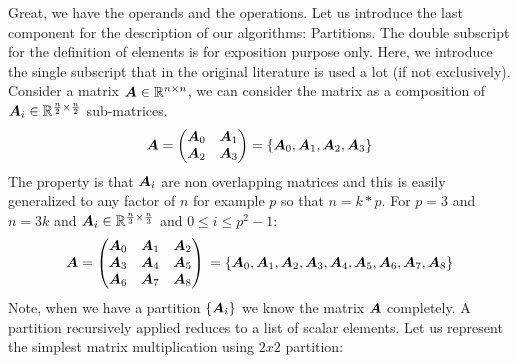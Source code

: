 \documentclass[acmsmall]{acmart}
\begin{document}
Great, we have the operands and the operations. Let us introduce the
last component for the description of our algorithms: Partitions.  The
double subscript for the definition of elements is for exposition
purpose only. Here, we introduce the single subscript that in the
original literature is used a lot (if not exclusively). Consider a
matrix ${\boldsymbol A} \in \mathbb{R}^{n\times n}$, we can consider the matrix as a
composition of ${\boldsymbol A}_i \in \mathbb{R}^{\frac{n}{2}\times \frac{n}{2}}$
sub-matrices.
\begin{equation} 
  {\boldsymbol A} =
  \begin{pmatrix}
    {\boldsymbol A}_0 & {\boldsymbol A}_1 \\
    {\boldsymbol A}_2 & {\boldsymbol A}_3 \\
  \end{pmatrix} = \{ {\boldsymbol A}_0 , {\boldsymbol A}_1, {\boldsymbol A}_2 , {\boldsymbol A}_3  \}
\end{equation}
The property is that ${\boldsymbol A}_i$ are non overlapping matrices and this
is easily generalized to any factor of $n$ for example $p$ so that $n
= k*p$. For $p=3$ and $n=3k$ and ${\boldsymbol A}_i \in \mathbb{R}^{\frac{n}{3}\times
  \frac{n}{3}}$ and $0\leq i\leq p^2 -1$:
\begin{equation} 
  {\boldsymbol A} =
  \begin{pmatrix}
    {\boldsymbol A}_0 & {\boldsymbol A}_1 & {\boldsymbol A}_2 \\
    {\boldsymbol A}_3 & {\boldsymbol A}_4 & {\boldsymbol A}_{5} \\
    {\boldsymbol A}_6 & {\boldsymbol A}_7 & {\boldsymbol A}_8 \\
  \end{pmatrix}\\
  = \{ {\boldsymbol A}_0 , {\boldsymbol A}_1, {\boldsymbol A}_2 , {\boldsymbol A}_3 ,{\boldsymbol A}_4 , {\boldsymbol A}_5, {\boldsymbol A}_6 , {\boldsymbol A}_7, {\boldsymbol A}_8   \}
\end{equation}
Note, when we have a partition $\{ {\boldsymbol A}_i \}$ we know the matrix
${\boldsymbol A}$ completely.  A partition recursively applied reduces to a
list of scalar elements. Let us represent the simplest matrix
multiplication using $2x2$ partition:
\end{document}
